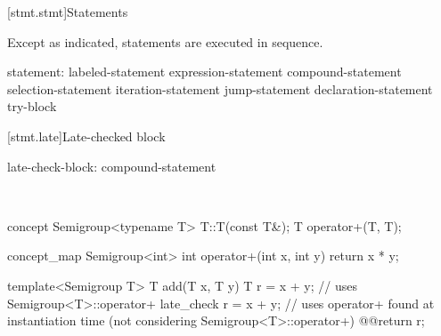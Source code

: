 \documentclass[american]{book}
\begin{document}
[stmt.stmt]{Statements}

\begin{paras}

\pnum
{}%
\textcolor{black}{}Except as indicated, statements are executed in sequence.
%

\begin{bnf}
%
statement:\br
    labeled-statement\br
    expression-statement\br
    compound-statement\br
    selection-statement\br
    iteration-statement\br
    jump-statement\br
    declaration-statement\br
    try-block\br
\end{bnf}

\color{addclr}
\setcounter{section}{8}
[stmt.late]{Late-checked block}

\pnum
{}
\addedConcepts{ \mbox{\exitnote}} 
  
\begin{bnf}
late-check-block:\br
     compound-statement
\end{bnf}

\pnum
\enterexample\
\begin{codeblock}
concept Semigroup<typename T> {
  T::T(const T&);
  T operator+(T, T);
}

concept_map Semigroup<int> {
  int operator+(int x, int y) { return x * y; }
}

template<Semigroup T> 
T add(T x, T y) { 
  T r = x + y; // uses Semigroup<T>::operator+
  late_check {
    r = x + y; // uses operator+ found at instantiation time (not considering Semigroup<T>::operator+)
  }
  @\textcolor{addclr}{}@return r;
}
\end{codeblock}
\exitexample\



\end{paras}
\end{document}
